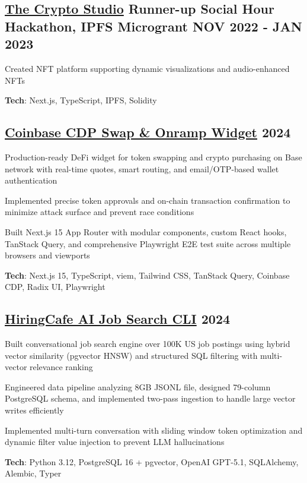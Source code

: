 \documentclass[letter,10pt]{article}
\begin{document}
\subsection{{ \href{https://github.com/Suhel-Kap/the-crypto-studio}{The Crypto Studio} Runner-up Social Hour Hackathon, IPFS Microgrant \hfill NOV 2022 - JAN 2023}}
\begin{zitemize}
  \item Created NFT platform supporting dynamic visualizations and audio-enhanced NFTs
  \item \textbf{Tech}: Next.js, TypeScript, IPFS, Solidity

\subsection{{ \href{https://github.com/Suhel-Kap/coinbase-swap-widget}{Coinbase CDP Swap \& Onramp Widget} \hfill 2024}}
\begin{zitemize}
  \item Production-ready DeFi widget for token swapping and crypto purchasing on Base network with real-time quotes, smart routing, and email/OTP-based wallet authentication
  \item Implemented precise token approvals and on-chain transaction confirmation to minimize attack surface and prevent race conditions
  \item Built Next.js 15 App Router with modular components, custom React hooks, TanStack Query, and comprehensive Playwright E2E test suite across multiple browsers and viewports
  \item \textbf{Tech}: Next.js 15, TypeScript, viem, Tailwind CSS, TanStack Query, Coinbase CDP, Radix UI, Playwright
\end{zitemize}

\subsection{{ \href{https://github.com/Suhel-Kap/hiringcafe-dataset-job-search}{HiringCafe AI Job Search CLI} \hfill 2024}}
\begin{zitemize}
  \item Built conversational job search engine over 100K US job postings using hybrid vector similarity (pgvector HNSW) and structured SQL filtering with multi-vector relevance ranking
  \item Engineered data pipeline analyzing 8GB JSONL file, designed 79-column PostgreSQL schema, and implemented two-pass ingestion to handle large vector writes efficiently
  \item Implemented multi-turn conversation with sliding window token optimization and dynamic filter value injection to prevent LLM hallucinations
  \item \textbf{Tech}: Python 3.12, PostgreSQL 16 + pgvector, OpenAI GPT-5.1, SQLAlchemy, Alembic, Typer
\end{zitemize}


\end{zitemize}
\end{document}
